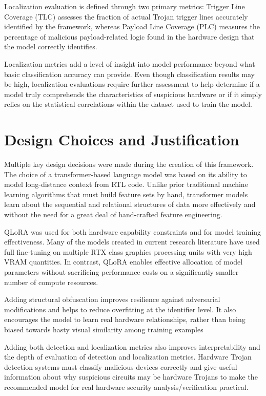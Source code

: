 \documentclass[12pt,a4paper]{report}
\begin{document}
Localization evaluation is defined through two primary metrics: Trigger Line Coverage (TLC) assesses the fraction of actual Trojan trigger lines accurately identified by the framework, whereas Payload Line Coverage (PLC) measures the percentage of malicious payload-related logic found in the hardware design that the model correctly identifies.

Localization metrics add a level of insight into model performance beyond what basic classification accuracy can provide. Even though classification results may be high, localization evaluations require further assessment to help determine if a model truly comprehends the characteristics of suspicious hardware or if it simply relies on the statistical correlations within the dataset used to train the model.

\section{Design Choices and Justification}

Multiple key design decisions were made during the creation of this framework. The choice of a transformer-based language model was based on its ability to model long-distance context from RTL code. Unlike prior traditional machine learning algorithms that must build feature sets by hand, transformer models learn about the sequential and relational structures of data more effectively and without the need for a great deal of hand-crafted feature engineering.

QLoRA was used for both hardware capability constraints and for model training effectiveness. Many of the models created in current research literature have used full fine-tuning on multiple RTX class graphics processing units with very high VRAM quantities. In contrast, QLoRA enables effective allocation of model parameters without sacrificing performance costs on a significantly smaller number of compute resources.

Adding structural obfuscation improves resilience against adversarial modifications and helps to reduce overfitting at the identifier level. It also encourages the model to learn real hardware relationships, rather than being biased towards hasty visual similarity among training examples

Adding both detection and localization metrics also improves interpretability and the depth of evaluation of detection and localization metrics. Hardware Trojan detection systems must classify malicious devices correctly and give useful information about why suspicious circuits may be hardware Trojans to make the recommended model for real hardware security analysis/verification practical.
\end{document}
